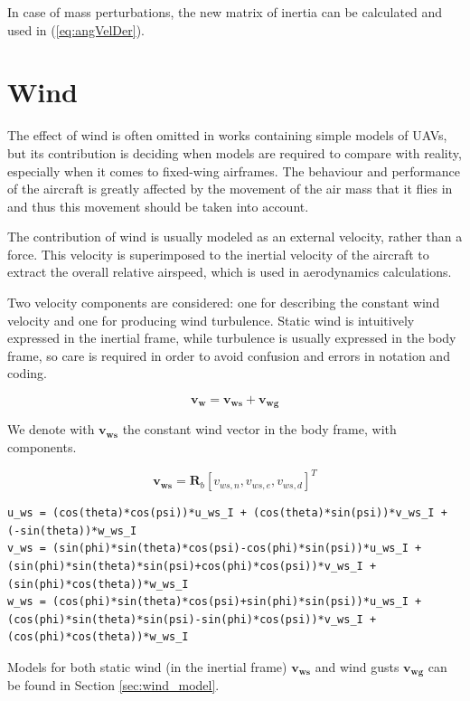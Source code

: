 In case of mass perturbations, the new matrix of inertia can be calculated and used in (\ref{eq:angVelDer}).

\section{Wind}\label{sec:wind}
The effect of wind is often omitted in works containing simple models of UAVs, but its contribution is deciding when models are required to compare with reality, especially when it comes to fixed-wing airframes. The behaviour and performance of the aircraft is greatly affected by the movement of the air mass that it flies in and thus this movement should be taken into account.

The contribution of wind is usually modeled as an external velocity, rather than a force. This velocity is superimposed to the inertial velocity of the aircraft to extract the overall relative airspeed, which is used in aerodynamics calculations.

Two velocity components are considered: one for describing the constant wind velocity and one for producing wind turbulence. Static wind is intuitively expressed in the inertial frame, while turbulence is usually expressed in the body frame, so care is required in order to avoid confusion and errors in notation and coding.

\begin{equation}
	\bm{v_w} = \bm{v_{ws}} + \bm{v_{wg}}
\end{equation}

We denote with $\bm{v_{ws}}$ the constant wind vector in the body frame, with components.

\begin{equation}
\bm{v_{ws}} = \bm{R}_b[v_{ws,n}, v_{ws,e}, v_{ws,d}]^T
\end{equation}

\begin{lstlisting}[style=C-style]
u_ws = (cos(theta)*cos(psi))*u_ws_I + (cos(theta)*sin(psi))*v_ws_I + (-sin(theta))*w_ws_I
v_ws = (sin(phi)*sin(theta)*cos(psi)-cos(phi)*sin(psi))*u_ws_I + (sin(phi)*sin(theta)*sin(psi)+cos(phi)*cos(psi))*v_ws_I + (sin(phi)*cos(theta))*w_ws_I
w_ws = (cos(phi)*sin(theta)*cos(psi)+sin(phi)*sin(psi))*u_ws_I + (cos(phi)*sin(theta)*sin(psi)-sin(phi)*cos(psi))*v_ws_I + (cos(phi)*cos(theta))*w_ws_I
\end{lstlisting}

Models for both static wind (in the inertial frame) $\bm{v_{ws}}$ and wind gusts $\bm{v_{wg}}$ can be found in Section \ref{sec:wind_model}.
